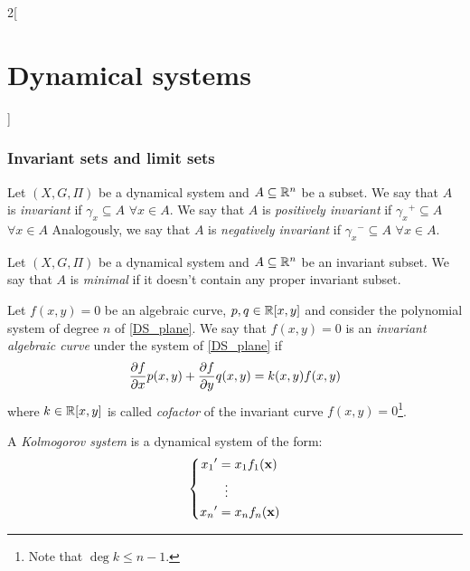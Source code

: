 \documentclass[../../../main_math.tex]{subfiles}
\begin{document}
\begin{multicols}{2}[\section{Dynamical systems}]
  \subsubsection{Invariant sets and limit sets}
  \begin{definition}
    Let $(X,G,\Pi)$ be a dynamical system and $A\subseteq \mathbb{R}^n$ be a subset. We say that $A$ is \emph{invariant} if $\gamma_x\subseteq A$ $\forall x\in A$. We say that $A$ is \emph{positively invariant} if ${\gamma_x}^+\subseteq A$ $\forall x\in A$ Analogously, we say that $A$ is \emph{negatively invariant} if ${\gamma_x}^-\subseteq A$ $\forall x\in A$.
  \end{definition}
  \begin{definition}
    Let $(X,G,\Pi)$ be a dynamical system and $A\subseteq \mathbb{R}^n$ be an invariant subset. We say that $A$ is \emph{minimal} if it doesn't contain any proper invariant subset.
  \end{definition}
  \begin{definition}
    Let $f(x,y)=0$ be an algebraic curve, $p,q\in\mathbb{R}[x,y]$ and consider the polynomial system of degree $n$ of \cref{DS_plane}. We say that $f(x,y)=0$ is an \emph{invariant algebraic curve} under the system of \cref{DS_plane} if
    \begin{equation}
      \pdv{f}{x}(x,y)p(x,y)+\pdv{f}{y}q(x,y)=k(x,y)f(x,y)
    \end{equation}
    where $k\in\mathbb{R}[x,y]$ is called \emph{cofactor} of the invariant curve $f(x,y)=0$\footnote{Note that $\deg k\leq n-1$.}.
  \end{definition}
  \begin{definition}
    A \emph{Kolmogorov system} is a dynamical system of the form:
    \begin{equation}
      \left\{
      \begin{aligned}
        {x_1}' & =x_1 f_1(\boldsymbol{\mathrm{x}}) \\
               & \;\;\vdots       \\
        {x_n}' & =x_n f_n(\boldsymbol{\mathrm{x}})
      \end{aligned}
      \right.
    \end{equation}
  \end{definition}

\end{multicols}
\end{document}
